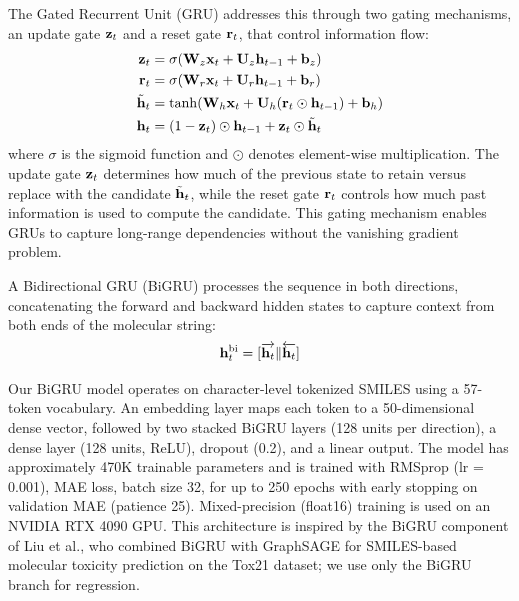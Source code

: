 The Gated Recurrent Unit (GRU)\cite{cho2014learning} addresses this through two gating mechanisms, an update gate $\mathbf{z}_t$ and a reset gate $\mathbf{r}_t$, that control information flow:
\begin{align}
    \mathbf{z}_t &= \sigma(\mathbf{W}_z \mathbf{x}_t + \mathbf{U}_z \mathbf{h}_{t-1} + \mathbf{b}_z) \label{eq:gru_update} \\
    \mathbf{r}_t &= \sigma(\mathbf{W}_r \mathbf{x}_t + \mathbf{U}_r \mathbf{h}_{t-1} + \mathbf{b}_r) \label{eq:gru_reset} \\
    \tilde{\mathbf{h}}_t &= \tanh(\mathbf{W}_h \mathbf{x}_t + \mathbf{U}_h (\mathbf{r}_t \odot \mathbf{h}_{t-1}) + \mathbf{b}_h) \label{eq:gru_candidate} \\
    \mathbf{h}_t &= (1 - \mathbf{z}_t) \odot \mathbf{h}_{t-1} + \mathbf{z}_t \odot \tilde{\mathbf{h}}_t \label{eq:gru_output}
\end{align}
where $\sigma$ is the sigmoid function and $\odot$ denotes element-wise multiplication.
The update gate $\mathbf{z}_t$ determines how much of the previous state to retain versus replace with the candidate $\tilde{\mathbf{h}}_t$, while the reset gate $\mathbf{r}_t$ controls how much past information is used to compute the candidate.
This gating mechanism enables GRUs to capture long-range dependencies without the vanishing gradient problem.

A Bidirectional GRU (BiGRU)\cite{schuster1997bidirectional} processes the sequence in both directions, concatenating the forward and backward hidden states to capture context from both ends of the molecular string:
\begin{equation}
    \mathbf{h}_t^{\text{bi}} = [\overrightarrow{\mathbf{h}_t} \| \overleftarrow{\mathbf{h}_t}]
\end{equation}

Our BiGRU model operates on character-level tokenized SMILES using a 57-token vocabulary.
An embedding layer maps each token to a 50-dimensional dense vector, followed by two stacked BiGRU layers (128 units per direction), a dense layer (128 units, ReLU), dropout (0.2), and a linear output.
The model has approximately 470K trainable parameters and is trained with RMSprop (lr = 0.001), MAE loss, batch size 32, for up to 250 epochs with early stopping on validation MAE (patience 25).
Mixed-precision (float16) training is used on an NVIDIA RTX 4090 GPU.
This architecture is inspired by the BiGRU component of Liu et al.\cite{liuPredictionMolecularToxicity2023}, who combined BiGRU with GraphSAGE for SMILES-based molecular toxicity prediction on the Tox21 dataset; we use only the BiGRU branch for regression.

